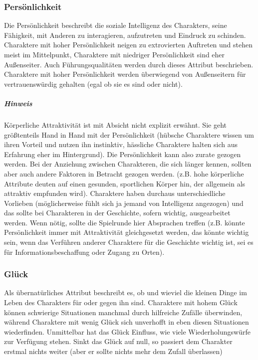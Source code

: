 \documentclass{article}
\begin{document}
\subsubsection{Persönlichkeit}

Die Persönlichkeit beschreibt die soziale Intelligenz des Charakters, seine Fähigkeit, mit Anderen zu interagieren, aufzutreten und Eindruck zu schinden. Charaktere mit hoher Persönlichkeit neigen zu extrovierten Auftreten und stehen meist im Mittelpunkt, Charaktere mit niedriger Persönlichkeit sind eher Außenseiter. Auch Führungsqualitäten werden durch dieses Attribut beschrieben. Charaktere mit hoher Persönlichkeit werden überwiegend von Außenseitern für vertrauenswürdig gehalten (egal ob sie es sind oder nicht).

\subparagraph{Hinweis}

Körperliche Attraktivität ist mit Absicht nicht explizit erwähnt. Sie geht größtenteils Hand in Hand mit der Persönlichkeit (hübsche Charaktere wissen um ihren Vorteil und nutzen ihn instinktiv, hässliche Charaktere halten sich aus Erfahrung eher im Hintergrund). Die Persönlichkeit kann also zurate gezogen werden. Bei der Anziehung zwischen Charakteren, die sich länger kennen, sollten aber auch andere Faktoren in Betracht gezogen werden. (z.B. hohe körperliche Attribute
deuten auf einen gesunden, sportlichen Körper hin, der allgemein als attraktiv empfunden wird). Charaktere haben durchaus unterschiedliche Vorlieben (möglicherweise fühlt sich ja jemand von Intelligenz angezogen) und das sollte bei Charakteren in der Geschichte, sofern wichtig, ausgearbeitet werden. Wenn nötig, sollte die Spielrunde hier Absprachen treffen (z.B. könnte Persönlichkeit immer mit Attraktivität gleichgesetzt werden, das könnte wichtig sein, wenn das Verführen anderer Charaktere für die Geschichte wichtig ist, sei es für Informationsbeschaffung oder Zugang zu Orten).

\subsubsection{Glück}

Als übernatürliches Attribut beschreibt es, ob und wieviel die kleinen Dinge im Leben des Charakters für oder gegen ihn
sind. Charaktere mit hohem Glück können schwierige Situationen manchmal durch hilfreiche Zufälle überwinden, während
Charaktere mit wenig Glück sich unverhofft in eben diesen Situationen wiederfinden. Unmittelbar hat das Glück Einfluss,
wie viele Wiederholungswürfe zur Verfügung stehen. Sinkt das Glück auf null, so passiert dem Charakter erstmal nichts
weiter (aber er sollte nichts mehr dem Zufall überlassen)
\end{document}
